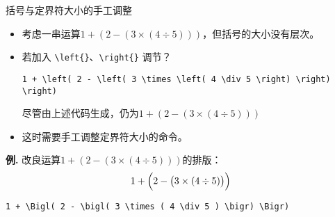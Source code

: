 \documentclass[mathserif]{beamer}
\newcommand{\codegreen}[1]{\textcolor{codegreen}{#1}}
\newenvironment{instance}{\zihao{-5}\textbf{\songti \codegreen{例.}}}{\hfill\par}
\begin{document}
\begin{frame}[fragile]{括号与定界符}{大小的手工调整}
\begin{itemize}

\item 考虑一串运算$1 + \left( 2 - \left( 3 \times \left( 4 \div 5 \right) \right) \right)$，但括号的大小没有层次。

\item 若加入 \lstinline'\left{}'、\lstinline'\right{}' 调节？
\begin{lstlisting}[numbers=none]
	1 + \left( 2 - \left( 3 \times \left( 4 \div 5 \right) \right) \right)
\end{lstlisting}
尽管由上述代码生成，仍为$1 + \left( 2 - \left( 3 \times \left( 4 \div 5 \right) \right) \right)$

\item 这时需要手工调整定界符大小的命令。

\end{itemize}
\begin{instance}
	改良运算$1 + \left( 2 - \left( 3 \times \left( 4 \div 5 \right) \right) \right)$的排版：
\begin{equation*}
	1 + \Bigl( 2 - \bigl( 3 \times ( 4 \div 5 ) \bigr) \Bigr)
\end{equation*}
\begin{lstlisting}[numbers=none]
	1 + \Bigl( 2 - \bigl( 3 \times ( 4 \div 5 ) \bigr) \Bigr)
\end{lstlisting}
\end{instance}
\end{frame}
\end{document}
